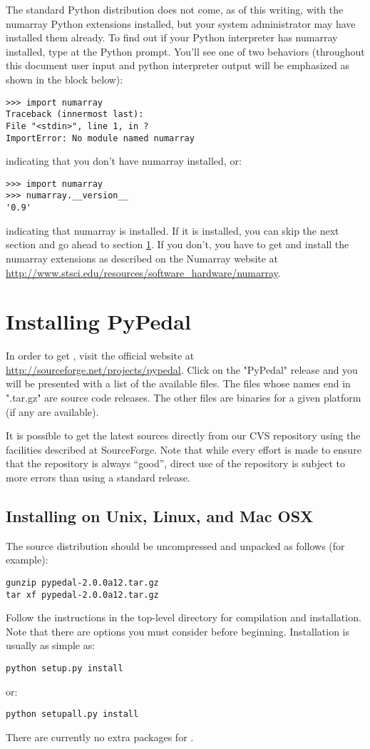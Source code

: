 The standard Python distribution does not come, as of this writing, with the
numarray Python extensions installed, but your system administrator may have
installed them already. To find out if your Python interpreter has numarray
installed, type  at the Python prompt. You'll see one of
two behaviors (throughout this document user input and python interpreter
output will be emphasized as shown in the block below):
\begin{verbatim}
>>> import numarray
Traceback (innermost last):
File "<stdin>", line 1, in ?
ImportError: No module named numarray
\end{verbatim}
indicating that you don't have numarray installed, or:
\begin{verbatim}
>>> import numarray
>>> numarray.__version__
'0.9'
\end{verbatim}
indicating that numarray is installed. If it is installed, you can skip the next section and go ahead to section \ref{sec:installing-pypedal}.  If you don't, you have to get and install the numarray extensions as described on the Numarray website at \url{http://www.stsci.edu/resources/software_hardware/numarray}.

\section{Installing PyPedal}
\label{sec:installing-pypedal}

In order to get \PYPEDAL{}, visit the official website at \url{http://sourceforge.net/projects/pypedal}.  Click on the "PyPedal" release and you will be presented with a list of the available files. The files whose names end in ".tar.gz" are source code releases. The other files are binaries for a given platform (if any are available).

It is possible to get the latest sources directly from our CVS repository using the facilities described at SourceForge. Note that while every effort is made to ensure that the repository is always ``good'', direct use of the repository is subject to more errors than using a standard release.

\subsection{Installing on Unix, Linux, and Mac OSX}
\label{sec:installing-unix}

The source distribution should be uncompressed and unpacked as follows (for
example):
\begin{verbatim}
gunzip pypedal-2.0.0a12.tar.gz
tar xf pypedal-2.0.0a12.tar.gz
\end{verbatim}
Follow the instructions in the top-level directory for compilation and installation. Note that there are options you must consider before beginning.  Installation is usually as simple as:
\begin{verbatim}
python setup.py install
\end{verbatim}
or:
\begin{verbatim}
python setupall.py install
\end{verbatim}
There are currently no extra packages for \PYPEDAL{}.


